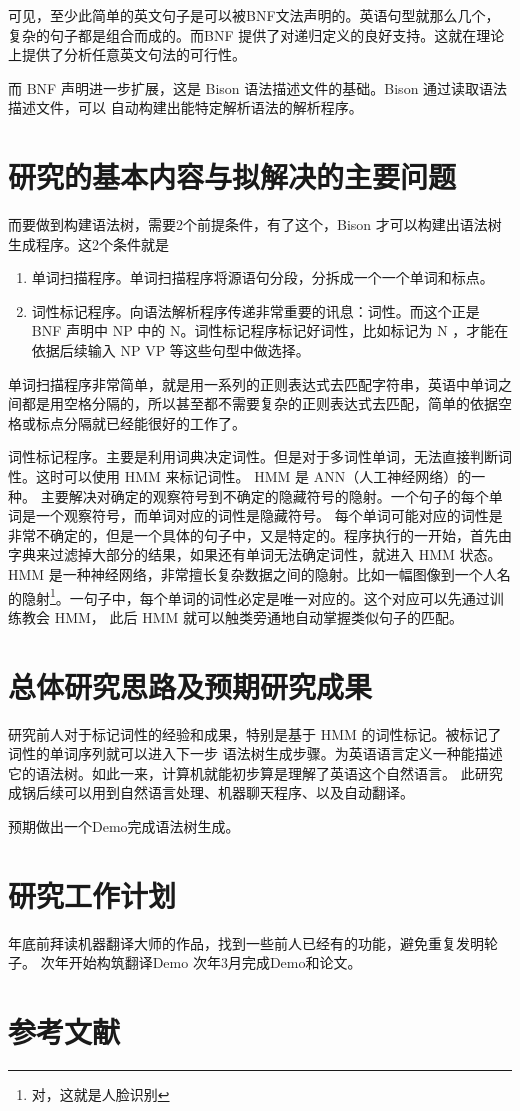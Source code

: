 可见，至少此简单的英文句子是可以被BNF文法声明的。英语句型就那么几个，复杂的句子都是组合而成的。而BNF
提供了对递归定义的良好支持。这就在理论上提供了分析任意英文句法的可行性。

而 BNF 声明进一步扩展，这是 Bison\cite{bison} 语法描述文件的基础。Bison 通过读取语法描述文件，可以
自动构建出能特定解析语法的解析程序。

\section{研究的基本内容与拟解决的主要问题}

而要做到构建语法树，需要2个前提条件，有了这个，Bison 才可以构建出语法树生成程序。这2个条件就是
\begin{enumerate}
\item 单词扫描程序。单词扫描程序将源语句分段，分拆成一个一个单词和标点。
\item 词性标记程序。向语法解析程序传递非常重要的讯息：词性。而这个正是 BNF 声明中 NP 中的 N。词性标记程序标记好词性，比如标记为 N ，才能在依据后续输入 NP VP 等这些句型中做选择。
\end{enumerate}

单词扫描程序非常简单，就是用一系列的正则表达式去匹配字符串，英语中单词之间都是用空格分隔的，所以甚至都不需要复杂的正则表达式去匹配，简单的依据空格或标点分隔就已经能很好的工作了。

词性标记程序。主要是利用词典决定词性。但是对于多词性单词，无法直接判断词性。这时可以使用 HMM\cite{HMM_Based_Part_Of_Speech_Tagging} 来标记词性。 HMM 是 ANN（人工神经网络）的一种。
主要解决对确定的观察符号到不确定的隐藏符号的隐射。一个句子的每个单词是一个观察符号，而单词对应的词性是隐藏符号。
每个单词可能对应的词性是非常不确定的，但是一个具体的句子中，又是特定的。程序执行的一开始，首先由字典来过滤掉大部分的结果，如果还有单词无法确定词性，就进入 HMM 状态。HMM 是一种神经网络，非常擅长复杂数据之间的隐射。比如一幅图像到一个人名的隐射\footnote{对，这就是人脸识别}。一句子中，每个单词的词性必定是唯一对应的。这个对应可以先通过训练教会 HMM， 此后 HMM 就可以触类旁通地自动掌握类似句子的匹配。

\section{总体研究思路及预期研究成果}

研究前人对于标记词性的经验和成果，特别是基于 HMM 的词性标记。被标记了词性的单词序列就可以进入下一步
语法树生成步骤。为英语语言定义一种能描述它的语法树。如此一来，计算机就能初步算是理解了英语这个自然语言。
此研究成锅后续可以用到自然语言处理、机器聊天程序、以及自动翻译。

预期做出一个Demo完成语法树生成。

\section{研究工作计划}

年底前拜读机器翻译大师的作品，找到一些前人已经有的功能，避免重复发明轮子。
次年开始构筑翻译Demo
次年3月完成Demo和论文。


\section{参考文献}

\nocite{STATMT}


